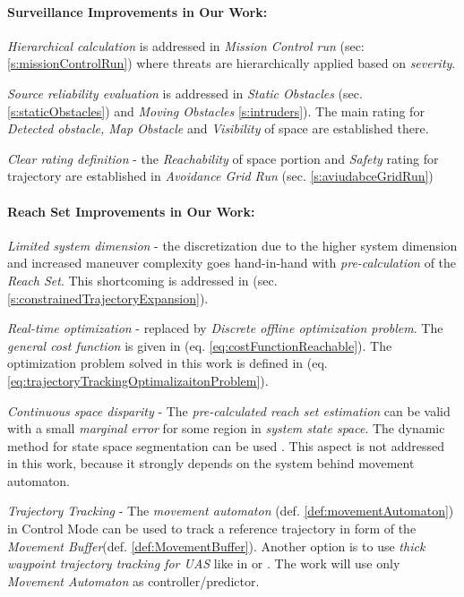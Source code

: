 \paragraph{Surveillance Improvements in Our Work:}

\emph{Hierarchical calculation} is addressed in \emph{Mission Control run} (sec: \ref{s:missionControlRun}) where threats are hierarchically applied based on \emph{severity}.

\emph{Source reliability evaluation} is addressed in \emph{Static Obstacles} (sec. \ref{s:staticObstacles}) and \emph{Moving Obstacles} \ref{s:intruders}). The main rating for \emph{Detected obstacle, Map Obstacle} and \emph{Visibility} of space are established there. 

\emph{Clear rating definition} - the \emph{Reachability} of space portion and \emph{Safety} rating for trajectory are established in \emph{Avoidance Grid Run} (sec. \ref{s:aviudabceGridRun})

\paragraph{Reach Set Improvements in Our Work:}

\emph{Limited system dimension} - the discretization due to the higher system dimension and  increased maneuver complexity goes hand-in-hand with \emph{pre-calculation} of the \emph{Reach Set}. This shortcoming is addressed in (sec. \ref{s:constrainedTrajectoryExpansion}).

\emph{Real-time optimization} -  replaced by \emph{Discrete offline optimization problem}. The \emph{general cost function} is given in (eq. \ref{eq:costFunctionReachable}). The optimization problem solved in this work is defined in (eq. \ref{eq:trajectoryTrackingOptimalizaitonProblem}).

\emph{Continuous space disparity} - The \emph{pre-calculated reach set estimation} can be valid with a small \emph{marginal error} for some region in \emph{system state space}. The dynamic method for state space segmentation can be used \cite{takahashi1996reasonable}. This aspect is not addressed in this work, because it strongly depends on the system behind movement automaton. 

\emph{Trajectory Tracking} - The \emph{movement automaton} (def. \ref{def:movementAutomaton}) in Control Mode can be used to track a reference trajectory in form of the \emph{Movement Buffer}(def. \ref{def:MovementBuffer}). Another option is to use \emph{thick waypoint trajectory tracking for UAS} like in \cite{kaminer1998trajectory} or \cite{murillo2015generalized}. The work will use only \emph{Movement Automaton} as controller/predictor.